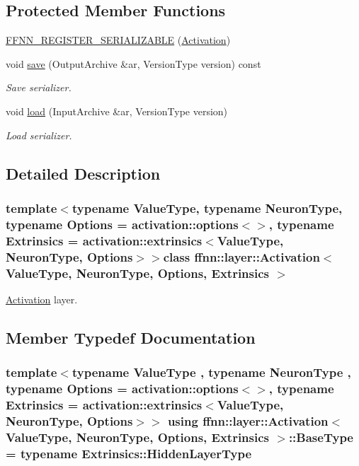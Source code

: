 \subsection*{Protected Member Functions}
\begin{DoxyCompactItemize}
\item 
\hyperlink{classffnn_1_1layer_1_1_activation_a3906f4c2c4b088138a0c55f261e87b73}{F\-F\-N\-N\-\_\-\-R\-E\-G\-I\-S\-T\-E\-R\-\_\-\-S\-E\-R\-I\-A\-L\-I\-Z\-A\-B\-L\-E} (\hyperlink{classffnn_1_1layer_1_1_activation}{Activation})
\item 
void \hyperlink{classffnn_1_1layer_1_1_activation_a5329111f161909571cd73319eb3f051e}{save} (Output\-Archive \&ar, Version\-Type version) const 
\begin{DoxyCompactList}\small\item\em Save serializer. \end{DoxyCompactList}\item 
void \hyperlink{classffnn_1_1layer_1_1_activation_a5441af8037bc04264f5c69c80696dc15}{load} (Input\-Archive \&ar, Version\-Type version)
\begin{DoxyCompactList}\small\item\em Load serializer. \end{DoxyCompactList}\end{DoxyCompactItemize}


\subsection{Detailed Description}
\subsubsection*{template$<$typename Value\-Type, typename Neuron\-Type, typename Options = activation\-::options$<$$>$, typename Extrinsics = activation\-::extrinsics$<$\-Value\-Type, Neuron\-Type, Options$>$$>$class ffnn\-::layer\-::\-Activation$<$ Value\-Type, Neuron\-Type, Options, Extrinsics $>$}

\hyperlink{classffnn_1_1layer_1_1_activation}{Activation} layer. 

\subsection{Member Typedef Documentation}
\hypertarget{classffnn_1_1layer_1_1_activation_a691766ba2bf67fd7f0987f4811d66850}{
\subsubsection[{Base\-Type}]{\setlength{\rightskip}{0pt plus 5cm}template$<$typename Value\-Type , typename Neuron\-Type , typename Options  = activation\-::options$<$$>$, typename Extrinsics  = activation\-::extrinsics$<$\-Value\-Type, Neuron\-Type, Options$>$$>$ using {\bf ffnn\-::layer\-::\-Activation}$<$ Value\-Type, Neuron\-Type, Options, Extrinsics $>$\-::{\bf Base\-Type} =  typename Extrinsics\-::\-Hidden\-Layer\-Type}}\label{classffnn_1_1layer_1_1_activation_a691766ba2bf67fd7f0987f4811d66850}


